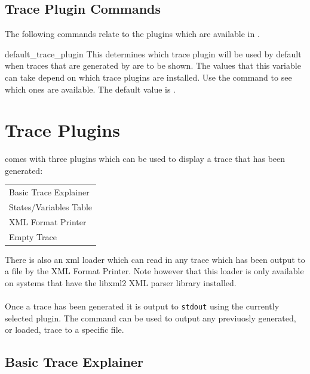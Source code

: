 \subsection{Trace Plugin Commands}
\label{Trace Plugin Commands}
The following commands relate to the plugins which are available
in \nusmv.



\begin{nusmvVar} {default\_trace\_plugin}{}{}
This determines which trace plugin will be used by default when traces
that are generated by \nusmv are to be shown. The values that this
variable can take depend on which trace plugins are installed. Use the
command
 to see which ones are available. The default
value is .
\end{nusmvVar}





\section{Trace Plugins}
\label{Trace Plugins}
\nusmv comes with three plugins which can be used to display a trace
that has been generated:

\begin{center}
\begin{tabular}{l}
Basic Trace Explainer\\
States/Variables Table\\
XML Format Printer\\
Empty Trace\\
\end{tabular}
\end{center}

There is also an xml loader which can read in any trace which has been
output to a file by the XML Format Printer. Note however that this
loader is only available on systems that have the libxml2 XML parser
library installed.\\
\\
Once a trace has been generated it is output to \texttt{stdout} using
the currently selected plugin. The command  can
be used to output any previuosly generated, or loaded, trace to a
specific file.

\subsection{Basic Trace Explainer}
\label{Basic Trace Explainer}


